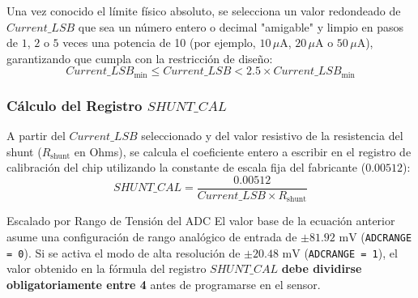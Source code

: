 \documentclass[
10pt, %
a4paper, %
oneside, %
headinclude,footinclude, %
BCOR5mm, %
]{scrartcl}
\begin{document}
Una vez conocido el límite físico absoluto, se selecciona un valor redondeado de $Current\_LSB$ que sea un número entero o decimal "amigable" y limpio en pasos de $1$, $2$ o $5$ veces una potencia de 10 (por ejemplo, $10\,\mu\text{A}$, $20\,\mu\text{A}$ o $50\,\mu\text{A}$), garantizando que cumpla con la restricción de diseño:
\begin{equation}
	Current\_LSB_{\text{min}} \le Current\_LSB < 2.5 \times Current\_LSB_{\text{min}}
\end{equation}

\subsubsection{Cálculo del Registro $SHUNT\_CAL$}
A partir del $Current\_LSB$ seleccionado y del valor resistivo de la resistencia del shunt ($R_{\text{shunt}}$ en Ohms), se calcula el coeficiente entero a escribir en el registro de calibración del chip utilizando la constante de escala fija del fabricante ($0.00512$):
\begin{equation}
	SHUNT\_CAL = \frac{0.00512}{Current\_LSB \times R_{\text{shunt}}}
\end{equation}

\begin{WarningBox}{Escalado por Rango de Tensión del ADC}
	El valor base de la ecuación anterior asume una configuración de rango analógico de entrada de $\pm 81.92\text{ mV}$ (\texttt{ADCRANGE = 0}). Si se activa el modo de alta resolución de $\pm 20.48\text{ mV}$ (\texttt{ADCRANGE = 1}), el valor obtenido en la fórmula del registro $SHUNT\_CAL$ \textbf{debe dividirse obligatoriamente entre 4} antes de programarse en el sensor.
\end{WarningBox}
\end{document}
